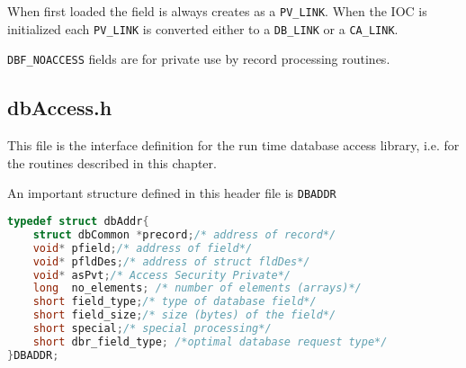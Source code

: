 When first loaded the field is always creates as a \verb|PV_LINK|.
When the IOC is initialized each \verb|PV_LINK| is converted either to a \verb|DB_LINK| or a \verb|CA_LINK|.

\verb|DBF_NOACCESS| fields are for private use by record processing routines.

\subsection{dbAccess.h}

This file is the interface definition for the run time database access library, i.e. for the routines described in this chapter.

An important structure defined in this header file is \verb|DBADDR|

\begin{lstlisting}[language=C]
typedef struct dbAddr{
    struct dbCommon *precord;/* address of record*/
    void* pfield;/* address of field*/
    void* pfldDes;/* address of struct fldDes*/
    void* asPvt;/* Access Security Private*/
    long  no_elements; /* number of elements (arrays)*/
    short field_type;/* type of database field*/
    short field_size;/* size (bytes) of the field*/
    short special;/* special processing*/
    short dbr_field_type; /*optimal database request type*/
}DBADDR;
\end{lstlisting}


